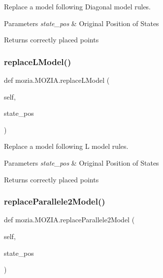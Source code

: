 Replace a model following Diagonal model rules. 


\begin{DoxyParams}{Parameters}
{\em state\+\_\+pos} & Original Position of States \\
\hline
\end{DoxyParams}
\begin{DoxyReturn}{Returns}
correctly placed points 
\end{DoxyReturn}
\mbox{\label{classmozia_1_1MOZIA_af2e034d0499d8776027e14208463ae02}} 
\subsubsection{\texorpdfstring{replaceLModel()}{replaceLModel()}}
{\footnotesize\ttfamily def mozia.\+M\+O\+Z\+I\+A.\+replace\+L\+Model (\begin{DoxyParamCaption}\item[{}]{self,  }\item[{}]{state\+\_\+pos }\end{DoxyParamCaption})}



Replace a model following L model rules. 


\begin{DoxyParams}{Parameters}
{\em state\+\_\+pos} & Original Position of States \\
\hline
\end{DoxyParams}
\begin{DoxyReturn}{Returns}
correctly placed points 
\end{DoxyReturn}
\mbox{\label{classmozia_1_1MOZIA_a8a6a9699370fc7a98c5558531f9d64fa}} 
\subsubsection{\texorpdfstring{replaceParallele2Model()}{replaceParallele2Model()}}
{\footnotesize\ttfamily def mozia.\+M\+O\+Z\+I\+A.\+replace\+Parallele2\+Model (\begin{DoxyParamCaption}\item[{}]{self,  }\item[{}]{state\+\_\+pos }\end{DoxyParamCaption})}



